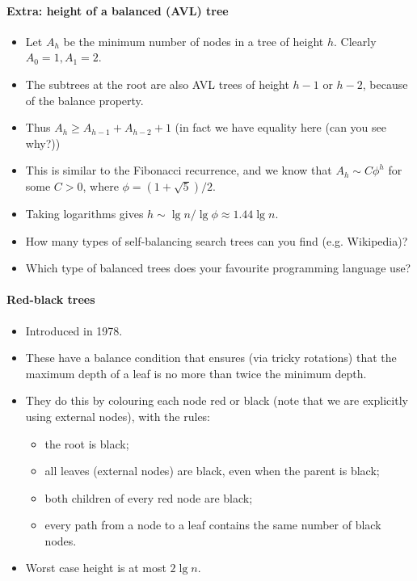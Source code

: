 \paragraph{Extra: height of a balanced (AVL) tree}
\begin{itemize}
\item Let $A_h$ be the minimum number of nodes in a tree of height $h$. Clearly 
$A_0 = 1, A_1 = 2$.
\item The subtrees at the root are also AVL trees of height $h-1$ or $h-2$, 
because of the balance property.
\item Thus $A_h \geq A_{h-1} + A_{h-2} + 1$ (in fact we have equality here 
(can you see why?))
\item This is similar to the Fibonacci recurrence, and we know that 
$A_h \sim C \phi^h$ for some $C>0$, where $\phi = (1+\sqrt{5})/2$. 
\item Taking logarithms gives $h \sim \lg n / \lg \phi \approx 1.44 \lg n$. 
\end{itemize}

\begin{Boxample}[2]
\begin{itemize}
\item How many types of self-balancing search trees can you find (e.g. Wikipedia)?
\item Which type of balanced trees does your favourite programming language use?
\end{itemize}
\end{Boxample}

\paragraph{Red-black trees}
\begin{itemize}
\item Introduced in 1978.
\item These have a balance condition that ensures (via tricky rotations) that the maximum depth of a leaf is no more than twice the minimum depth.
\item They do this by colouring each node red or black (note that we are explicitly using external nodes), with the rules:
\begin{itemize}
\item the root is black;
\item all leaves (external nodes) are black, even when the parent is black;
\item both children of every red node are black;
\item every path from a node to a leaf contains the same number of black nodes.
\end{itemize}
\item Worst case height is at most $2 \lg n$.
\end{itemize}

